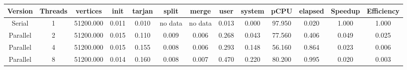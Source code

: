 \begin{tabular}{|c|c|c|c|c|c|c|c|c|c|c|c|c|}
\toprule
 Version &  Threads &  vertices &  init &  tarjan &   split &   merge &  user &  system &   pCPU &  elapsed &  Speedup &  Efficiency \\
\midrule
  Serial &        1 & 51200.000 & 0.011 &   0.010 & no data & no data & 0.013 &   0.000 & 97.950 &    0.020 &    1.000 &       1.000 \\
Parallel &        2 & 51200.000 & 0.015 &   0.110 &   0.009 &   0.006 & 0.268 &   0.043 & 77.560 &    0.406 &    0.049 &       0.025 \\
Parallel &        4 & 51200.000 & 0.015 &   0.155 &   0.008 &   0.006 & 0.293 &   0.148 & 56.160 &    0.864 &    0.023 &       0.006 \\
Parallel &        8 & 51200.000 & 0.014 &   0.160 &   0.008 &   0.007 & 0.470 &   0.220 & 80.200 &    0.995 &    0.020 &       0.003 \\
\bottomrule
\end{tabular}
